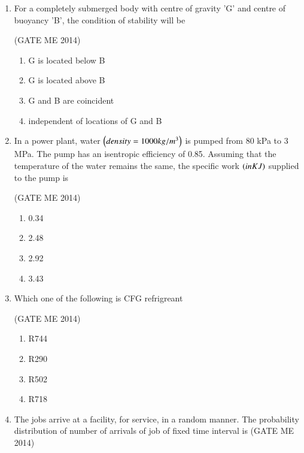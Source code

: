 \documentclass[journal]{IEEEtran}
\numberwithin{equation}{enumi}
\numberwithin{figure}{enumi}
\begin{document}
\begin{enumerate}
    
    The free stream velocity is U., and the free stream temperature T is lower than the cylinder
surface temperature Ts. The local heat transfer coefficient is minimum at point

 \hfill{(GATE ME 2014)}
 
\begin{multicols}{4}
    \begin{enumerate}
        \item 1
        \item 2
        \item 3
        \item 4
    \end{enumerate}
\end{multicols}
\item For a completely submerged body with centre of gravity 'G' and centre of buoyancy 'B', the
condition of stability will be

 \hfill{(GATE ME 2014)}
 
\begin{enumerate}
    \item G is located below B
    \item G is located above B
    \item G and B are coincident
    \item independent of locations of G and B
\end{enumerate}

\item In a power plant, water  $\left(density=1000 kg/m^3\right)$ is pumped from 80 kPa to 3 MPa. The pump has an
isentropic efficiency of 0.85. Assuming that the temperature of the water remains the same, the
specific work  $\left(in KJ\right)$ supplied to the pump is

 \hfill{(GATE ME 2014)}
 
\begin{enumerate}
    \item 0.34
    \item 2.48
    \item 2.92
    \item 3.43
\end{enumerate}
\item Which one of the following is CFG refrigreant

  \hfill{(GATE ME 2014)}
  
\begin{multicols}{4}
    \begin{enumerate}
        \item R744
        \item R290
        \item R502
        \item R718
    \end{enumerate}
\end{multicols}
\item The jobs arrive at a facility, for service, in a random manner. The probability distribution of number of arrivals of job of fixed time interval is 
 \hfill{(GATE ME 2014)}
 

\end{enumerate}
\end{document}
